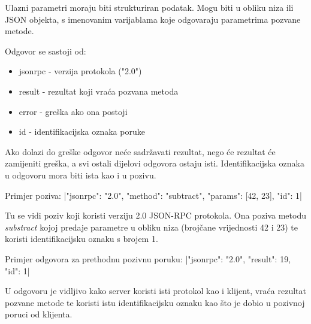 Ulazni parametri moraju biti strukturiran podatak. Mogu biti u obliku niza ili
JSON objekta, s imenovanim varijablama koje odgovaraju parametrima pozvane
metode.

Odgovor se sastoji od:
\begin{itemize}
    \item jsonrpc - verzija protokola ("2.0")
    \item result - rezultat koji vraća pozvana metoda
    \item error - greška ako ona postoji
    \item id - identifikacijska oznaka poruke
\end{itemize}

Ako dolazi do greške odgovor neće sadržavati rezultat, nego će rezultat će
zamijeniti greška, a svi ostali dijelovi odgovora ostaju isti.
Identifikacijska oznaka u odgovoru mora biti ista kao i u pozivu.

Primjer poziva:
|{"jsonrpc": "2.0", "method": "subtract", "params": [42, 23], "id": 1}|

Tu se vidi poziv koji koristi verziju 2.0 JSON-RPC protokola. Ona poziva metodu
\emph{substract} kojoj predaje parametre u obliku niza (brojčane vrijednosti 42
i 23) te koristi identifikacijsku oznaku s brojem 1.

Primjer odgovora za prethodnu pozivnu poruku:
|{"jsonrpc": "2.0", "result": 19, "id": 1}|

U odgovoru je vidljivo kako server koristi isti protokol kao i klijent, vraća rezultat
pozvane metode te koristi istu identifikacijsku oznaku kao što je dobio u
pozivnoj poruci od klijenta.

